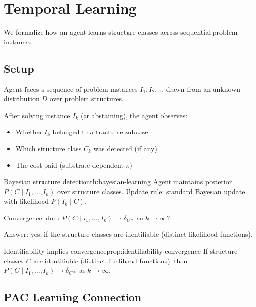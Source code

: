 \section{Temporal Learning}\label{sec:temporal-learning}

We formalize how an agent learns structure classes across sequential problem instances.

\subsection{Setup}

Agent faces a sequence of problem instances $I_1, I_2, \ldots$ drawn from an unknown distribution $D$ over problem structures.

After solving instance $I_k$ (or abstaining), the agent observes:
\begin{itemize}
\item Whether $I_k$ belonged to a tractable subcase
\item Which structure class $C_k$ was detected (if any)
\item The cost paid (substrate-dependent $\kappa$)
\end{itemize}

\begin{claim}{Bayesian structure detection}{th:bayesian-learning}
Agent maintains posterior $P(C \mid I_1, \ldots, I_k)$ over structure classes. Update rule: standard Bayesian update with likelihood $P(I_k \mid C)$.
\end{claim}


Convergence: does $P(C \mid I_1, \ldots, I_k) \to \delta_{C*}$ as $k \to \infty$?

Answer: yes, if the structure classes are identifiable (distinct likelihood functions).

\begin{claim}{Identifiability implies convergence}{prop:identifiability-convergence}
If structure classes $C$ are identifiable (distinct likelihood functions), then $P(C \mid I_1, \ldots, I_k) \to \delta_{C*}$ as $k \to \infty$.
\end{claim}


\subsection{PAC Learning Connection}

